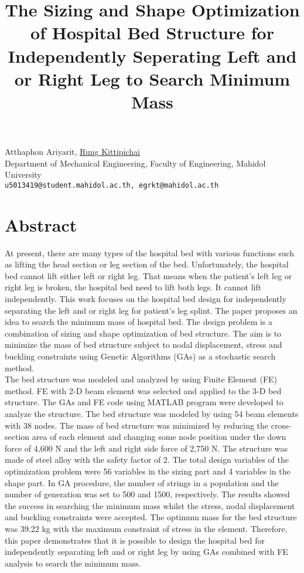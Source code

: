 \title{The Sizing and Shape Optimization of Hospital Bed Structure for Independently Seperating Left and or Right Leg to Search Minimum Mass}
\author{} \institute{}
\maketitle

\begin{center}
\vspace{-6mm}
{\large Atthaphon Ariyarit, \underline{Rung Kittipichai}}\\
Department of Mechanical Engineering, Faculty of Engineering, Mahidol University\\
{\tt u5013419@student.mahidol.ac.th, egrkt@mahidol.ac.th}\\
\end{center}

\section*{Abstract}
At present, there are many types of the hospital bed with various functions such as lifting the head section or leg section of the bed. Unfortunately, the hospital bed cannot lift either left or right leg. That means when the patient's left leg or right leg is broken, the hospital bed need to lift both legs. It cannot lift independently.  This work focuses on the hospital bed design for independently separating the left and or right leg  for patient's leg splint. The paper proposes an idea to search the minimum mass of hospital bed. The design problem is a combination of sizing and shape optimization of bed structure. The aim is to minimize the mass of bed structure subject to nodal displacement, stress and buckling constraints using Genetic Algorithms (GAs) as a stochastic search method.\\
The bed structure was modeled and analyzed by using Finite Element (FE) method. FE with 2-D beam element was selected and applied to the 3-D bed structure. The GAs and FE code using MATLAB program were developed to analyze the structure. The bed structure was modeled by using 54 beam elements with 38 nodes. The mass of bed structure was minimized by reducing the cross-section area of each element and changing some node position under the down force of 4,600 N and the left and right side force of 2,750 N. The structure was made of steel alloy with the safety factor of 2. The total design variables of the optimization problem were 56 variables in the sizing part and 4 variables in the shape part.  In GA procedure, the number of strings in a population and the number of generation was set to 500 and 1500, respectively. The results showed the success in searching the minimum mass whilst the stress, nodal displacement and buckling constraints were accepted. The optimum mass for the bed structure was 39.22 kg with the maximum constraint of stress in the element. Therefore, this paper demonstrates that it is possible to design the hospital bed for independently separating left and or right leg by using GAs combined with FE analysis to search the minimum mass. 

